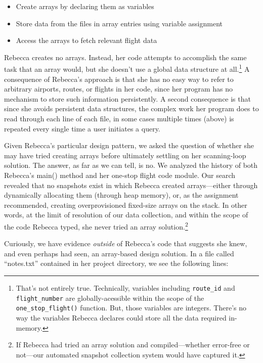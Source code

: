 \begin{itemize}
\tightlist
\item
  Create arrays by declaring them as variables
\item
  Store data from the files in array entries using variable assignment
\item
  Access the arrays to fetch relevant flight data
\end{itemize}

Rebecca creates no arrays. Instead, her code attempts to accomplish the same task that an array would, but she doesn't use a global data structure at all.\footnote{That's not entirely true. Technically, variables including \texttt{route\_id} and \texttt{flight\_number} are globally-acessible within the scope of the \texttt{one\_stop\_flight()} function. But, those variables are integers. There's no way the variables Rebecca declares could store all the data required in-memory.} A consequence of Rebecca's approach is that she has no easy way to refer to arbitrary airports, routes, or flights in her code, since her program has no mechanism to store such information persistently. A second consequence is that since she avoids persistent data structures, the complex work her program does to read through each line of each file, in some cases multiple times (above) is repeated every single time a user initiates a query.

Given Rebecca's particular design pattern, we asked the question of whether she may have tried creating arrays before ultimately settling on her scanning-loop solution. The answer, as far as we can tell, is no. We analyzed the history of both Rebecca's main() method and her one-stop flight code module. Our search revealed that no snapshots exist in which Rebecca created arrays---either through dynamically allocating them (through heap memory), or, as the assignment recommended, creating overprovisioned fixed-size arrays on the stack. In other words, at the limit of resolution of our data collection, and within the scope of the code Rebecca typed, she never tried an array solution.\footnote{If Rebecca had tried an array solution and compiled---whether error-free or not---our automated snapshot collection system would have captured it.}

Curiously, we have evidence \emph{outside} of Rebecca's code that suggests she knew, and even perhaps had seen, an array-based design solution. In a file called ``notes.txt'' contained in her project directory, we see the following lines:

